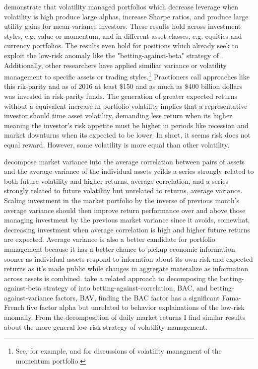 \citet{moreira_volatility-managed_2017} demonstrate that volatility managed portfolios which decrease leverage when volatility is high produce large alphas, increase Sharpe ratios, and produce large utility gains for mean-variance investors. These results hold across investment styles, e.g. value or momentum, and in different asset classes, e.g. equities and currency portfolios. The results even hold for positions which already seek to exploit the low-risk anomaly like the "betting-against-beta" strategy of \citet{frazzini_betting_2014}. Additionally, other researchers have applied similiar variance or volatility management to specific assets or trading styles.\footnote{See, for example, \citet{barroso_momentum_2015} and \citet{kim_time_2016} for discussions of volatility managment of the momentum portfolio.} Practioners call approaches like this rik-parity and as of 2016 at least \$150 and as much as \$400 billion dollars was invested in risk-parity funds.\citep{steward_truly_2010,cao_risk_2016} The generation of greater expected returns without a equivalent increase in portfolio volatility implies that a representative investor should time asset volatility, demanding less return when its higher meaning the investor's risk appetite must be higher in periods like recession and market downturns when its expected to be lower. In short, it seems risk does not equal reward. However, some volatility is more equal than other volatility.

\citet{pollet_average_2010} decompose market variance into the average correlation between pairs of assets and the average variance of the individual assets yeilds a series strongly related to both future volatility and higher returns, average correlation, and a series strongly related to future volatility but unrelated to returns, average variance. Scaling investment in the market portfolio by the inverse of previous month’s average variance should then improve return performance over and above those managing investment by the previous market variance since it avoids, somewhat, decreasing investment when average correlation is high and higher future returns are expected. Average variance is also a better candidate for portfolio management because it has a better chance to pickup economic information sooner as individual assets respond to informtion about its own risk and expected returns as it's made public while changes in aggregate materalize as information across assets is combined.\citep{campbell1997econometrics,campbell_have_2001} \citet{asness_betting_2018} take a related approach to decomposing the betting-against-beta strategy of \citet{frazzini_betting_2014} into betting-against-correlation, BAC, and betting-against-variance factors, BAV, finding the BAC factor has a significant Fama-French five factor alpha but unrelated to behavior explainations of the low-risk anomally.\citep{fama_dissecting_2016} From the decomposition of daily market returns I find similar results about the more general low-risk strategy of volatility management.

